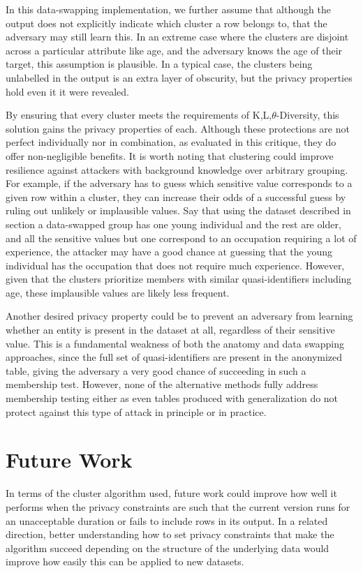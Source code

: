 In this data-swapping implementation, we further assume that although the output does not explicitly indicate which cluster a row belongs to, that the adversary may still learn this. In an extreme case where the clusters are disjoint across a particular attribute like age, and the adversary knows the age of their target, this assumption is plausible. In a typical case, the clusters being unlabelled in the output is an extra layer of obscurity, but the privacy properties hold even it it were revealed.

By ensuring that every cluster meets the requirements of K,L,$\theta$-Diversity, this solution gains the privacy properties of each. Although these protections are not perfect individually nor in combination, as evaluated in this critique\cite{domingoCritique}, they do offer non-negligible benefits. It is worth noting that clustering could improve resilience against attackers with background knowledge over arbitrary grouping. For example, if the adversary has to guess which sensitive value corresponds to a given row within a cluster, they can increase their odds of a successful guess by ruling out unlikely or implausible values. Say that using the dataset described in section  a data-swapped group has one young individual and the rest are older, and all the sensitive values but one correspond to an occupation requiring a lot of experience, the attacker may have a good chance at guessing that the young individual has the occupation that does not require much experience. However, given that the clusters prioritize members with similar quasi-identifiers including age, these implausible values are likely less frequent.

Another desired privacy property could be to prevent an adversary from learning whether an entity is present in the dataset at all, regardless of their sensitive value. This is a fundamental weakness of both the anatomy and data swapping approaches, since the full set of quasi-identifiers are present in the anonymized table, giving the adversary a very good chance of succeeding in such a membership test. However, none of the alternative methods fully address membership testing either as even tables produced with generalization do not protect against this type of attack in principle or in practice.

\section{Future Work}
In terms of the cluster algorithm used, future work could improve how well it performs when the privacy constraints are such that the current version runs for an unacceptable duration or fails to include rows in its output. In a related direction, better understanding how to set privacy constraints that make the algorithm succeed depending on the structure of the underlying data would improve how easily this can be applied to new datasets.

